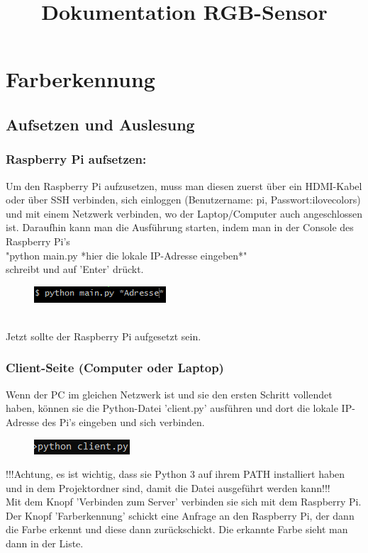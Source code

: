 \documentclass[10pt,a4paper]{report}
\title{Dokumentation RGB-Sensor}
\author
\begin{document}
	\maketitle
	\newpage
	\tableofcontents
	\newpage
	
	\chapter{Farberkennung}
	\newpage
	\section{Aufsetzen und Auslesung}
	\subsection{Raspberry Pi aufsetzen:}
	Um den Raspberry Pi aufzusetzen, muss man diesen zuerst über ein HDMI-Kabel oder über SSH verbinden, sich 			einloggen (Benutzername: pi, Passwort:ilovecolors) und 
	mit einem Netzwerk verbinden, wo der Laptop/Computer auch angeschlossen ist. Daraufhin kann man die Ausführung 		starten, indem man in der Console des Raspberry Pi's \\ "python main.py *hier die lokale IP-Adresse eingeben*" 		\\ schreibt und auf 'Enter' drückt.
	\begin{figure}[h]
	\includegraphics{beispiel.png}
	\end{figure}
	\\
	Jetzt sollte der Raspberry Pi aufgesetzt sein.
	\\
	\subsection{Client-Seite (Computer oder Laptop)}
	Wenn der PC im gleichen Netzwerk ist und sie den ersten Schritt vollendet haben, können sie die Python-Datei 		'client.py' ausführen und dort die lokale IP-Adresse des Pi's eingeben und sich verbinden.

	\begin{figure}[h]
	\includegraphics{beispiel2.png}
	\end{figure}	
	!!!Achtung, es ist wichtig, dass sie Python 3 auf ihrem PATH installiert haben und in dem Projektordner sind, 
	damit die Datei ausgeführt werden kann!!! 
	\\
	Mit dem Knopf 'Verbinden zum Server' verbinden sie sich mit dem Raspberry Pi. Der Knopf 'Farberkennung' 
	schickt eine Anfrage an den Raspberry Pi, der dann die Farbe erkennt und diese dann zurückschickt. Die erkannte 
	Farbe sieht man dann in der Liste.
	
\end{document}
